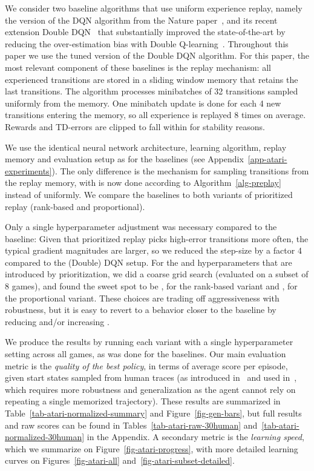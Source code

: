 \documentclass[a4paper]{article}
\begin{document}
We consider two baseline algorithms that use uniform experience replay, namely the version of the DQN algorithm from the Nature paper~\citep{dqn-nature},
and its recent extension Double DQN~\citep{double-dqn} that substantially improved the state-of-the-art by reducing the over-estimation bias with Double Q-learning~\citep{double-q}.  Throughout this paper we use the tuned version of the Double DQN algorithm.
For this paper, the most relevant component of these baselines is the replay mechanism:
all experienced transitions are stored in a sliding window memory that retains the
last  transitions.
The algorithm processes minibatches of 32 transitions sampled uniformly from the memory. One minibatch update is done for each 4 new transitions entering the memory, so all experience is replayed 8 times on average. Rewards and TD-errors are clipped to fall within  for stability reasons.

We use the identical neural network architecture, learning algorithm, replay memory and evaluation setup as for the baselines (see Appendix~\ref{app-atari-experiments}).
The only difference is the mechanism for sampling transitions from the replay memory, with is now done according to Algorithm~\ref{alg-preplay} instead of uniformly.
We compare the baselines to both variants of prioritized replay (rank-based and proportional).

Only a single hyperparameter adjustment was necessary compared to the baseline:
Given that prioritized replay picks high-error transitions more often, the typical gradient magnitudes
are larger, so we reduced the step-size  by a factor 4 compared to the (Double) DQN setup.
For the  and  hyperparameters that are introduced by prioritization, 
we did a coarse grid search (evaluated on a subset of 8 games), 
and found the sweet spot to be ,  for the rank-based variant
and ,  for the proportional variant.
These choices are trading off aggressiveness with robustness, but it is easy to revert to a behavior closer to the baseline by reducing  and/or increasing .


We produce the results by running each variant with a single hyperparameter setting across all games, as was done for the baselines.
Our main evaluation metric is the \emph{quality of the best policy}, in terms of average score per episode, given start states sampled from human traces 
(as introduced in~\citealp{gorila} and used in~\citealp{double-dqn},
which requires more robustness and generalization as the agent cannot rely on repeating a single memorized trajectory).   
These results are summarized in Table~\ref{tab-atari-normalized-summary} and Figure~\ref{fig-gen-bars}, 
but full results and raw scores can be found in 
Tables~\ref{tab-atari-raw-30human} and~\ref{tab-atari-normalized-30human} in the Appendix.
A secondary metric is the \emph{learning speed}, which we summarize on Figure~\ref{fig-atari-progress}, with more detailed learning curves on Figures~\ref{fig-atari-all} and~\ref{fig-atari-subset-detailed}.
\end{document}
